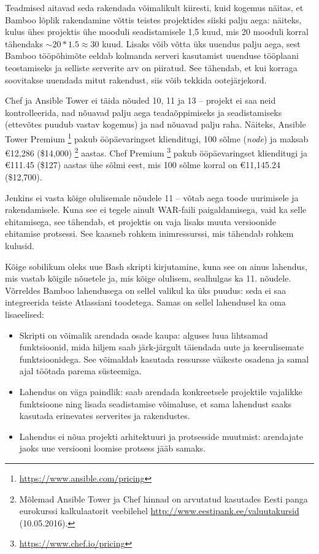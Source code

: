 \documentclass[12pt]{article}
\begin{document}
  Teadmised aitavad seda rakendada võimalikult kiiresti, kuid kogemus näitas, et Bamboo lõplik rakendamine võttis teistes projektides siiski palju aega: näiteks, kulus ühes projektis ühe mooduli seadistamisele 1,5 kuud, mis 20 mooduli korral tähendaks $\sim20*1.5 \approx 30$ kuud. Lisaks võib võtta üks uuendus palju aega, sest Bamboo tööpõhimõte eeldab kolmanda serveri kasutamist uuenduse tööplaani teostamiseks ja selliste serverite arv on piiratud. See tähendab, et kui korraga soovitakse uuendada mitut rakendust, siis võib tekkida ootejärjekord.
  
  Chef ja Ansible Tower ei täida nõuded 10, 11 ja 13 \--- projekt ei saa neid kontrolleerida, nad nõuavad palju aega teadaõppimiseks ja seadistamiseks (ettevõtes puudub vastav kogemus) ja nad nõuavad palju raha. Näiteks, Ansible Tower Premium \footnote{\url{https://www.ansible.com/pricing}} pakub ööpäevaringset klienditugi, 100 sõlme (\textit{node}) ja maksab \euro 12,286 (\$14,000) \footnote{Mõlemad Ansible Tower ja Chef hinnad on arvutatud kasutades Eesti panga eurokurssi kalkulaatorit veebilehel \url{http://www.eestipank.ee/valuutakursid} (10.05.2016).} aastas. Chef Premium \footnote{\url{https://www.chef.io/pricing}} pakub ööpäevaringset klienditugi ja \euro 111.45 (\$127) aastas ühe sõlmi eest, mis 100 sõlme korral on \euro 11,145.24 (\$12,700).
  
  Jenkins ei vasta kõige olulisemale nõudele 11 \--- võtab aega toode uurimisele ja rakendamisele. Kuna see ei tegele ainult WAR\--faili paigaldamisega, vaid ka selle ehitamisega, see tähendab, et projektis on vaja lisaks muuta versioonide ehitamise protsessi. See kaasneb rohkem inimressurssi, mis tähendab rohkem kulusid.
  
  \newpage
  
  Kõige sobilikum oleks uue Bash skripti kirjutamine, kuna see on ainus lahendus, mis vastab kõigile nõuetele ja, mis kõige olulisem, sealhulgas ka 11. nõudele. Võrreldes Bamboo lahendusega on sellel valikul ka üks puudus: seda ei saa integreerida teiste Atlassiani toodetega. Samas on sellel lahendusel ka oma lisaeelised:
  \begin{itemize}
    \item Skripti on võimalik arendada osade kaupa: alguses luua lihtsamad funktsioonid, mida hiljem saab järk-järgult täiendada uute ja keerulisemate funktsioonidega. See võimaldab kasutada ressursse väikeste osadena ja samal ajal töötada parema süsteemiga.
    \item Lahendus on väga paindlik: saab arendada konkreetsele projektile vajalikke funktsioone ning lisada seadistamise võimaluse, et sama lahendust saaks kasutada erinevates serverites ja rakendustes.
    \item Lahendus ei nõua projekti arhitektuuri ja protsesside muutmist: arendajate jaoks uue versiooni loomise protsess jääb samaks.
  \end{itemize}
  
\end{document}
